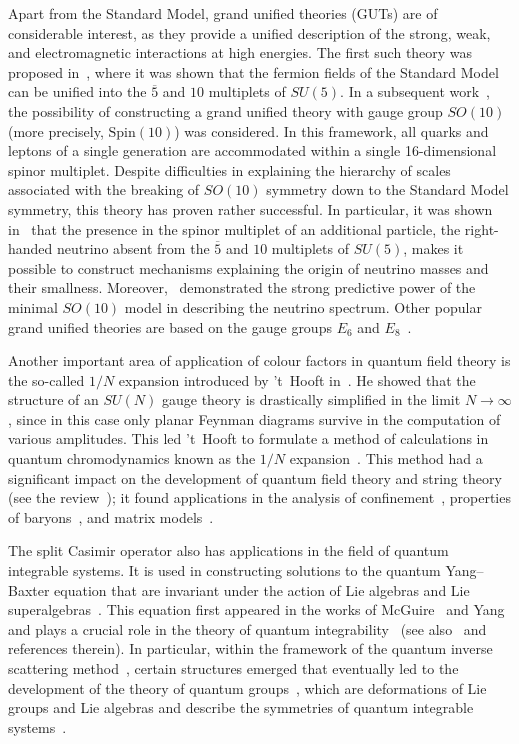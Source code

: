 \documentclass[a4paper]{article}
\newcommand{\Spin}{\mathrm{Spin}}
\renewcommand{\=}{\ =\ }
\numberwithin{equation}{section}
\theoremstyle{remark}
\begin{document}
Apart from the Standard Model, grand unified theories (GUTs) are of considerable interest, as they provide a unified description of the strong, weak, and electromagnetic interactions at high energies. The first such theory was proposed in~\cite{GeorGlas}, where it was shown that the fermion fields of the Standard Model can be unified into the $\overline{5}$ and $10$ multiplets of $SU(5)$. In a subsequent work~\cite{FritMink}, the possibility of constructing a grand unified theory with gauge group $SO(10)$ (more precisely, $\Spin(10)$) was considered. In this framework, all quarks and leptons of a single generation are accommodated within a single 16-dimensional spinor multiplet. Despite difficulties in explaining the hierarchy of scales associated with the breaking of $SO(10)$ symmetry down to the Standard Model symmetry, this theory has proven rather successful. In particular, it was shown in~\cite{G-MRamSlan} that the presence in the spinor multiplet of an additional particle, the right-handed neutrino absent from the $\overline{5}$ and $10$ multiplets of $SU(5)$, makes it possible to construct mechanisms explaining the origin of neutrino masses and their smallness. Moreover,~\cite{BaMoh} demonstrated the strong predictive power of the minimal $SO(10)$ model in describing the neutrino spectrum. Other popular grand unified theories are based on the gauge groups $E_6$ and $E_8$~\cite{E_6 GUT, E_8 GUT}.

Another important area of application of colour factors in quantum field theory is the so-called $1/N$ expansion introduced by 't~Hooft in~\cite{tHooft}. He showed that the structure of an $SU(N)$ gauge theory is drastically simplified in the limit $N \to \infty$, since in this case only planar Feynman diagrams survive in the computation of various amplitudes. This led 't~Hooft to formulate a method of calculations in quantum chromodynamics known as the $1/N$ expansion~\cite{tHooft}. This method had a significant impact on the development of quantum field theory and string theory (see the review~\cite{AGMO}); it found applications in the analysis of confinement~\cite{tHooft2}, properties of baryons~\cite{Witten}, and matrix models~\cite{FrGinZinn}.

The split Casimir operator also has applications in the field of quantum integrable systems. It is used in constructing solutions to the quantum Yang--Baxter equation that are invariant under the action of Lie algebras and Lie superalgebras~\cite{IsKrad2,IsPrad2,MacKay}. This equation first appeared in the works of McGuire~\cite{McGuire} and Yang~\cite{Yang} and plays a crucial role in the theory of quantum integrability~\cite{Baxter,Zam} (see also~\cite{ChaPr} and references therein). In particular, within the framework of the quantum inverse scattering method~\cite{SkTFad}, certain structures emerged that eventually led to the development of the theory of quantum groups~\cite{Drin,Jim,Jim2}, which are deformations of Lie groups and Lie algebras and describe the symmetries of quantum integrable systems~\cite{PasSal,KarZap}.
\end{document}
